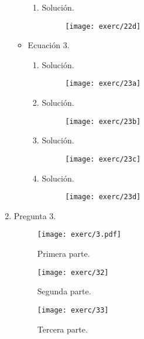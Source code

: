 \documentclass[fleqn]{article}
\begin{document}
\begin{enumerate}
\begin{itemize}
\begin{enumerate}[label=\alph*)]
    \item Solución.
      \begin{figure}[H]
        \centering
        \texttt{[image: exerc/22d]}
      \end{figure}
    \end{enumerate}
  \item Ecuación 3.
    \begin{enumerate}[label=\alph*)]
    \item Solución.
      \begin{figure}[H]
        \centering
        \texttt{[image: exerc/23a]}
      \end{figure}
    \item Solución.
      \begin{figure}[H]
        \centering
        \texttt{[image: exerc/23b]}
      \end{figure}

    \item Solución.
      \begin{figure}[H]
        \centering
        \texttt{[image: exerc/23c]}
      \end{figure}

    \item Solución.
      \begin{figure}[H]
        \centering
        \texttt{[image: exerc/23d]}
      \end{figure}
    \end{enumerate}
  \end{itemize}

\item Pregunta 3.
  \begin{figure}[H]
    \centering
    \texttt{[image: exerc/3.pdf]}
    \caption{Primera parte.}
  \end{figure}
  \begin{figure}[H]
    \centering
    \texttt{[image: exerc/32]}
    \caption{Segunda parte.}
  \end{figure}

    \begin{figure}[H]
    \centering
    \texttt{[image: exerc/33]}
    \caption{Tercera parte.}
  \end{figure}


\end{enumerate}
\end{document}
